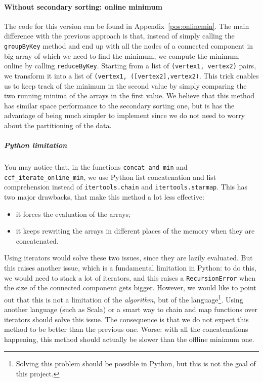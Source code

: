 \documentclass[a4paper,12pt]{article}
\begin{document}
\paragraph{Without secondary sorting: online minimum} The code for this version can be found in Appendix~\ref{pos:onlinemin}. The main difference with the previous approach is that, instead of simply calling the \verb|groupByKey| method and end up with all the nodes of a connected component in big array of which we need to find the minimum, we compute the minimum online by calling \verb|reduceByKey|. Starting from a list of \verb|(vertex1, vertex2)| pairs, we transform it into a list of \verb|(vertex1, ([vertex2],vertex2)|. This trick enables us to keep track of the minimum in the second value by simply comparing the two running minima of the arrays in the first value. We believe that this method has similar space performance to the secondary sorting one, but is has the advantage of being much simpler to implement since we do not need to worry about the partitioning of the data.
\subparagraph{Python limitation} You may notice that, in the functions \verb|concat_and_min| and \verb|ccf_iterate_online_min|, we use Python list concatenation and list comprehension instead of \verb|itertools.chain| and \verb|itertools.starmap|. This has two major drawbacks, that make this method a lot less effective:
\begin{itemize}
    \item it forces the evaluation of the arrays;
    \item it keeps rewriting the arrays in different places of the memory when they are concatenated.
\end{itemize}
Using iterators would solve these two issues, since they are lazily evaluated. But this raises another issue, which is a fundamental limitation in Python: to do this, we would need to stack a lot of iterators, and this raises a \verb|RecursionError| when the size of the connected component gets bigger. However, we would like to point out that this is not a limitation of the \emph{algorithm}, but of the language\footnote{Solving this problem should be possible in Python, but this is not the goal of this project.}. Using another language (such as Scala) or a smart way to chain and map functions over iterators should solve this issue. The consequence is that we do not expect this method to be better than the previous one. Worse: with all the concatenations happening, this method should actually be slower than the offline minimum one.
\end{document}
